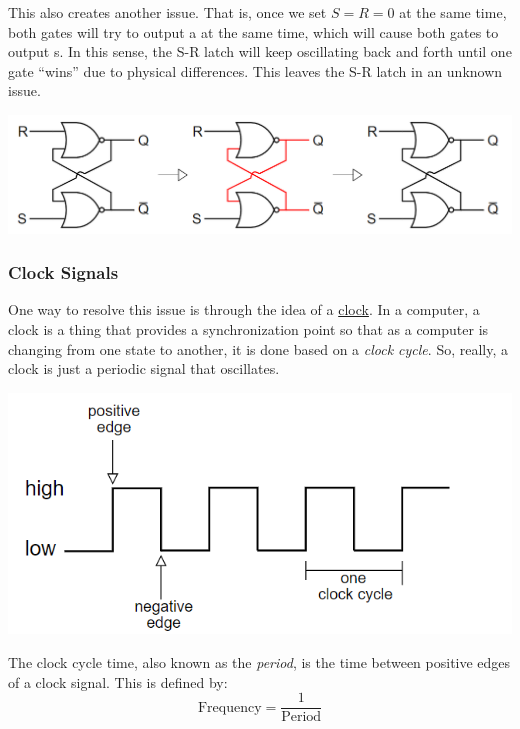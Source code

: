 \documentclass[letterpaper]{article}
\begin{document}
This also creates another issue. That is, once we set $S = R = 0$ at the same time, both  gates will try to output a  at the same time, which will cause both  gates to output s. In this sense, the S-R latch will keep oscillating back and forth until one  gate ``wins'' due to physical differences. This leaves the S-R latch in an unknown issue. 
\begin{center}
    \includegraphics[scale=0.5]{sr_bad_2.PNG}
\end{center}

\subsubsection{Clock Signals}
One way to resolve this issue is through the idea of a \underline{clock}. In a computer, a clock is a thing that provides a synchronization point so that as a computer is changing from one state to another, it is done based on a \emph{clock cycle}. So, really, a clock is just a periodic signal that oscillates. 
\begin{center}
    \includegraphics[scale=0.5]{clock.PNG}
\end{center}
The clock cycle time, also known as the \emph{period}, is the time between positive edges of a clock signal. This is defined by:
\[\text{Frequency} = \frac{1}{\text{Period}}\]
\end{document}
